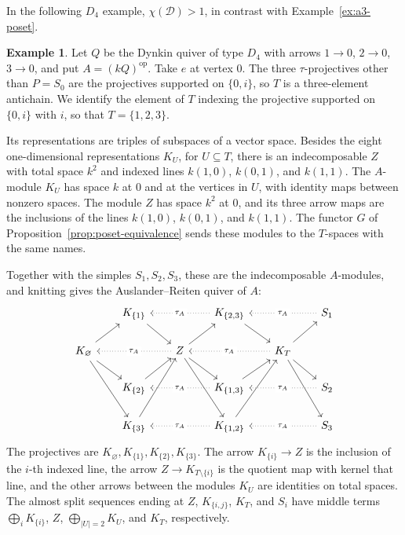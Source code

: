 \documentclass[a4paper,reqno,10pt]{amsart}
\theoremstyle{definition}
\newtheorem{example}[theorem]{Example}
\numberwithin{equation}{section}
\newcommand{\op}{\mathrm{op}}
\newcommand{\cD}{\mathcal D}
\begin{document}
In the following \(D_4\) example, \(\chi(\cD)>1\), in contrast with
Example~\ref{ex:a3-poset}.
\begin{example}\label{ex:d4-subspaces}
Let \(Q\) be the Dynkin quiver of type \(D_4\) with arrows
\(1\to0\), \(2\to0\), \(3\to0\), and put
\(A=(kQ)^\op\). Take \(e\) at vertex 0. The three
\(\tau\)-projectives other than \(P=S_0\) are the projectives supported
on \(\{0,i\}\), so \(T\) is a three-element antichain. We identify the
element of \(T\) indexing the projective supported on \(\{0,i\}\) with
\(i\), so that \(T=\{1,2,3\}\).

Its representations are triples of subspaces of a vector space. Besides
the eight one-dimensional representations \(K_U\), for \(U\subseteq T\),
there is an indecomposable \(Z\) with total space \(k^2\) and indexed lines
\(k(1,0)\), \(k(0,1)\), and \(k(1,1)\).
The \(A\)-module \(K_U\) has space \(k\) at 0 and at the vertices in
\(U\), with identity maps between nonzero spaces. The module \(Z\)
has space \(k^2\) at 0, and its three arrow maps are the inclusions
of the lines \(k(1,0)\), \(k(0,1)\), and \(k(1,1)\). The functor \(G\) of
Proposition~\ref{prop:poset-equivalence} sends these modules to the
\(T\)-spaces with the same names.

Together with the simples \(S_1,S_2,S_3\), these are the indecomposable
\(A\)-modules, and knitting gives the Auslander--Reiten quiver of \(A\):
\[
\begin{tikzcd}[row sep=1.7em,column sep=1.9em]
 & K_{\{1\}} \arrow[dr] && K_{\{2,3\}} \arrow[dr]
   \arrow[ll,dotted,"\tau_A" description] && S_1
   \arrow[ll,dotted,"\tau_A" description] \\
 K_\varnothing \arrow[ur] \arrow[dr] \arrow[ddr]
 && Z \arrow[ur] \arrow[dr] \arrow[ddr]
   \arrow[ll,dotted,"\tau_A" description]
 && K_T \arrow[ur] \arrow[dr] \arrow[ddr]
   \arrow[ll,dotted,"\tau_A" description] & \\
 & K_{\{2\}} \arrow[ur] && K_{\{1,3\}} \arrow[ur]
   \arrow[ll,dotted,"\tau_A" description] && S_2
   \arrow[ll,dotted,"\tau_A" description] \\
 & K_{\{3\}} \arrow[uur] && K_{\{1,2\}} \arrow[uur]
   \arrow[ll,dotted,"\tau_A" description] && S_3
   \arrow[ll,dotted,"\tau_A" description]
\end{tikzcd}
\]
The projectives are \(K_\varnothing,K_{\{1\}},K_{\{2\}},K_{\{3\}}\).
The arrow \(K_{\{i\}}\to Z\) is the inclusion of the \(i\)-th indexed line,
the arrow \(Z\to K_{T\setminus\{i\}}\) is the quotient map with kernel
that line, and the other arrows between the modules \(K_U\) are
identities on total spaces.
The almost split sequences ending at \(Z\), \(K_{\{i,j\}}\), \(K_T\),
and \(S_i\) have middle terms \(\bigoplus_iK_{\{i\}}\), \(Z\),
\(\bigoplus_{|U|=2}K_U\), and \(K_T\), respectively.


\end{example}
\end{document}
